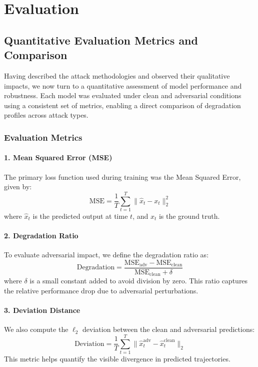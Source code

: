 \chapter{Evaluation}

\section{Quantitative Evaluation Metrics and Comparison}

Having described the attack methodologies and observed their qualitative impacts, we now turn to a quantitative assessment of model performance and robustness. Each model was evaluated under clean and adversarial conditions using a consistent set of metrics, enabling a direct comparison of degradation profiles across attack types.

\subsection{Evaluation Metrics}

\subsubsection*{1. Mean Squared Error (MSE)}
The primary loss function used during training was the Mean Squared Error, given by:
\[
\text{MSE} = \frac{1}{T} \sum_{t=1}^{T} \| \hat{x}_t - x_t \|_2^2
\]
where $\hat{x}_t$ is the predicted output at time $t$, and $x_t$ is the ground truth.

\subsubsection*{2. Degradation Ratio}
To evaluate adversarial impact, we define the degradation ratio as:
\[
\text{Degradation} = \frac{\text{MSE}_{\text{adv}} - \text{MSE}_{\text{clean}}}{\text{MSE}_{\text{clean}} + \delta}
\]
where $\delta$ is a small constant added to avoid division by zero. This ratio captures the relative performance drop due to adversarial perturbations.

\subsubsection*{3. Deviation Distance}
We also compute the $\ell_2$ deviation between the clean and adversarial predictions:
\[
\text{Deviation} = \frac{1}{T} \sum_{t=1}^{T} \| \hat{x}_t^{\text{adv}} - \hat{x}_t^{\text{clean}} \|_2
\]
This metric helps quantify the visible divergence in predicted trajectories.

